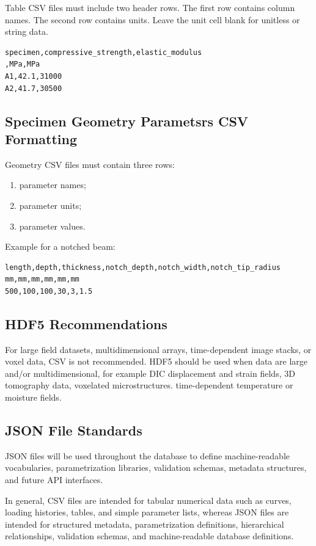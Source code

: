 \documentclass[11pt]{book}
\begin{document}
Table CSV files must include two header rows. The first row contains column names. The second row contains units. Leave the unit cell blank for unitless or string data.

\begin{verbatim}
specimen,compressive_strength,elastic_modulus
,MPa,MPa
A1,42.1,31000
A2,41.7,30500
\end{verbatim}

\subsection{Specimen Geometry Parametsrs CSV Formatting}

Geometry CSV files must contain three rows:

\begin{enumerate}
    \item parameter names;
    \item parameter units;
    \item parameter values.
\end{enumerate}

Example for a notched beam:

\begin{verbatim}
length,depth,thickness,notch_depth,notch_width,notch_tip_radius
mm,mm,mm,mm,mm,mm
500,100,100,30,3,1.5
\end{verbatim}

\subsection{HDF5 Recommendations}

For large field datasets, multidimensional arrays, time-dependent image stacks, or voxel data, CSV is not recommended. HDF5 should be used when data are large and/or multidimensional, for example DIC displacement and strain fields, 3D tomography data, voxelated microstructures. time-dependent temperature or moisture fields.

\subsection{JSON File Standards}

JSON files will be used throughout the database to define machine-readable vocabularies, parametrization libraries, validation schemas, metadata structures, and future API interfaces.

In general, CSV files are intended for tabular numerical data such as curves, loading histories, tables, and simple parameter lists, whereas JSON files are intended for structured metadata, parametrization definitions, hierarchical relationships, validation schemas, and
machine-readable database definitions.
\end{document}
